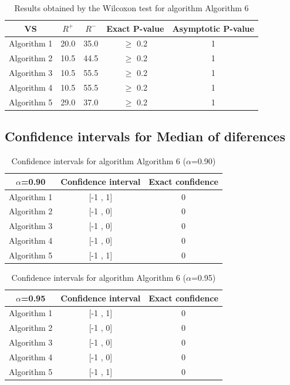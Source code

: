 \documentclass[a4paper,10pt]{article}
\begin{document}
\begin{table}[!htp]
\centering\small
\begin{tabular}{
|c|c|c|c|c|}
\hline
 VS & $R^{+}$ & $R^{-}$ & Exact P-value & Asymptotic P-value \\ \hline 
Algorithm 1 & 20.0 & 35.0 & $\geq$ 0.2 & 1\\ \hline 
Algorithm 2 & 10.5 & 44.5 & $\geq$ 0.2 & 1\\ \hline 
Algorithm 3 & 10.5 & 55.5 & $\geq$ 0.2 & 1\\ \hline 
Algorithm 4 & 10.5 & 55.5 & $\geq$ 0.2 & 1\\ \hline 
Algorithm 5 & 29.0 & 37.0 & $\geq$ 0.2 & 1\\ \hline 

\end{tabular}
\caption{Results obtained by the Wilcoxon test for algorithm Algorithm 6}
\end{table}

\subsection{Confidence intervals for Median of diferences}

\begin{table}[!htp]
\centering\small
\begin{tabular}{
|c|c|c|}
\hline
 $\alpha$=0.90 & Confidence interval & Exact confidence \\ \hline 
Algorithm 1 & [-1 , 1] & 0\\ \hline 
Algorithm 2 & [-1 , 0] & 0\\ \hline 
Algorithm 3 & [-1 , 0] & 0\\ \hline 
Algorithm 4 & [-1 , 0] & 0\\ \hline 
Algorithm 5 & [-1 , 1] & 0\\ \hline 

\end{tabular}
\caption{Confidence intervals for algorithm Algorithm 6 ($\alpha$=0.90)}
\end{table}
\begin{table}[!htp]
\centering\small
\begin{tabular}{
|c|c|c|}
\hline
 $\alpha$=0.95 & Confidence interval & Exact confidence \\ \hline 
Algorithm 1 & [-1 , 1] & 0\\ \hline 
Algorithm 2 & [-1 , 0] & 0\\ \hline 
Algorithm 3 & [-1 , 0] & 0\\ \hline 
Algorithm 4 & [-1 , 0] & 0\\ \hline 
Algorithm 5 & [-1 , 1] & 0\\ \hline 

\end{tabular}
\caption{Confidence intervals for algorithm Algorithm 6 ($\alpha$=0.95)}
\end{table}

 \clearpage 
\end{document}
